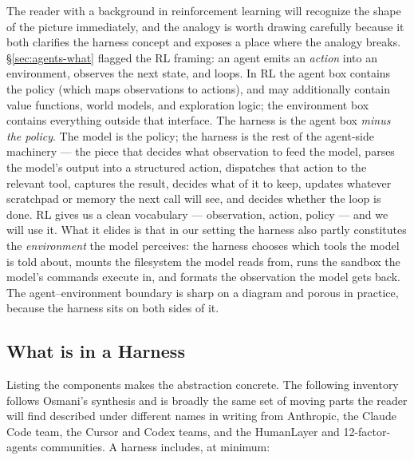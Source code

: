 The reader with a background in reinforcement learning will
recognize the shape of the picture immediately, and the analogy
is worth drawing carefully because it both clarifies the harness
concept and exposes a place where the analogy breaks.
\S\ref{sec:agents-what} flagged the RL framing: an agent emits an
\emph{action} into an environment, observes the next state, and
loops. In RL the agent box contains the policy (which maps
observations to actions), and may additionally contain value
functions, world models, and exploration logic; the environment
box contains everything outside that interface. The harness is
the agent box \emph{minus the policy}. The model is the policy;
the harness is the rest of the agent-side machinery --- the
piece that decides what observation to feed the model, parses
the model's output into a structured action, dispatches that
action to the relevant tool, captures the result, decides what
of it to keep, updates whatever scratchpad or memory the next
call will see, and decides whether the loop is done. RL gives us
a clean vocabulary --- observation, action, policy --- and we
will use it. What it elides is that in our setting the harness
also partly constitutes the \emph{environment} the model
perceives: the harness chooses which tools the model is told
about, mounts the filesystem the model reads from, runs the
sandbox the model's commands execute in, and formats the
observation the model gets back. The agent--environment boundary
is sharp on a diagram and porous in practice, because the
harness sits on both sides of it.

\subsection{What is in a Harness}
\label{sec:agents-harness-what}

Listing the components makes the abstraction concrete. The
following inventory follows Osmani's synthesis and is broadly
the same set of moving parts the reader will find described
under different names in writing from Anthropic, the Claude Code
team, the Cursor and Codex teams, and the HumanLayer and
12-factor-agents communities. A harness includes, at minimum:


